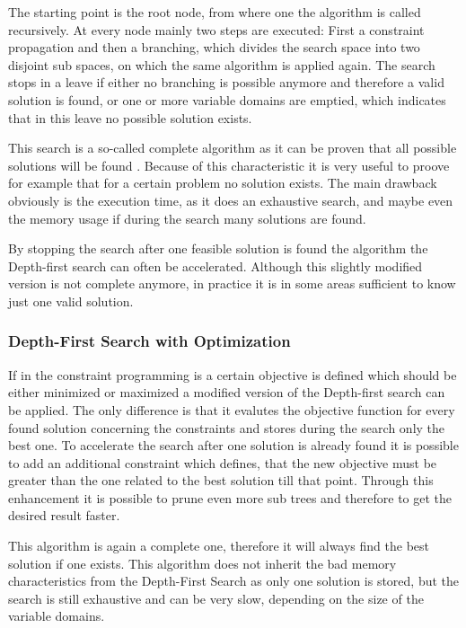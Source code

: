\documentclass[10pt,
               a4paper,
               journal,
               ]{IEEEtran}
\begin{document}
	The starting point is the root node, from where one the algorithm is called recursively. At every node mainly two steps are executed: First a constraint propagation and then a branching, which divides the search space into two disjoint sub spaces, on which the same algorithm is applied again. The search stops in a leave if either no branching is possible anymore and therefore a valid solution is found, or one or more variable domains are emptied, which indicates that in this leave no possible solution exists.
	
	This search is a so-called complete algorithm as it can be proven that all possible solutions will be found \cite[p.~85]{handbookCP}. Because of this characteristic it is very useful to proove for example that for a certain problem no solution exists. The main drawback obviously is the execution time, as it does an exhaustive search, and maybe even the memory usage if during the search many solutions are found.
	
	By stopping the search after one feasible solution is found the algorithm the Depth-first search can often be accelerated. Although this slightly modified version is not complete anymore, in practice it is in some areas sufficient to know just one valid solution.
	
	\subsubsection{Depth-First Search with Optimization}
	If in the constraint programming is a certain objective is defined which should be either minimized or maximized a modified version of the Depth-first search can be applied. The only difference is that it evalutes the objective function for every found solution concerning the constraints and stores during the search only the best one. To accelerate the search after one solution is already found it is possible to add an additional constraint which defines, that the new objective must be greater than the one related to the best solution till that point. Through this enhancement it is possible to prune even more sub trees and therefore to get the desired result faster.
	
	This algorithm is again a complete one, therefore it will always find the best solution if one exists. This algorithm does not inherit the bad memory characteristics from the Depth-First Search as only one solution is stored, but the search is still exhaustive and can be very slow, depending on the size of the variable domains.
	
\end{document}
